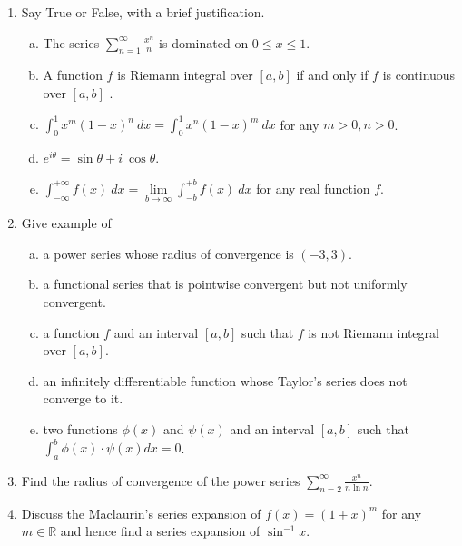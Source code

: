 \documentclass[journal,12pt,twocolumn]{IEEEtran}
\begin{document}
\begin{enumerate}
\item Say True or False, with a brief justification. \\


\begin{enumerate}[(a)]
\setlength\itemsep{2em}

\item The series $\sum\limits_{n=1}^{\infty}\frac{x^n}{n}$ is dominated on $0 \leqslant x \leqslant 1$.
\item A function $f$ is Riemann integral over $[a,b]$ if and only if $f$ is continuous over $[a,b]$ .
\item $\int_{0}^{1}x^m(1-x)^n \ dx = \int_{0}^{1}x^n(1-x)^m \ dx$ for any $m>0, n>0$.
\item $e^{i\theta} = \sin\theta + i \ \cos\theta$.
\item $\int_{-\infty}^{+\infty} f(x) \ dx = \lim\limits_{b \to \infty}\int_{-b}^{+b}f(x) \ dx$ for any real function $f$.\\
\end{enumerate}

\item Give example of  \\

\begin{enumerate}[(a)]
\setlength\itemsep{2em}

\item a power series whose radius of convergence is $(-3,3)$.
\item a functional series that is pointwise convergent but not uniformly convergent.
\item a function $f$ and an interval $[a,b]$ such that $f$ is not Riemann integral over $[a,b]$.
\item an infinitely differentiable function whose Taylor's series does not converge to it.
\item two functions $ \phi(x)$ and $\psi(x)$ and an interval $[a,b]$ such that $\int_{a}^{b} \phi(x) \cdot \psi(x) dx=0$.\\
\end{enumerate}


\item Find the radius of convergence of the power series $\sum\limits_{n=2}^{\infty}\frac{x^n}{n\ln n}$. \\


\item Discuss the Maclaurin's series expansion of $f(x)=(1+x)^m$ for any $m \in \mathbb{R}$ and hence find a series expansion of $\sin ^{-1} x$. \\


\end{enumerate}
\end{document}
